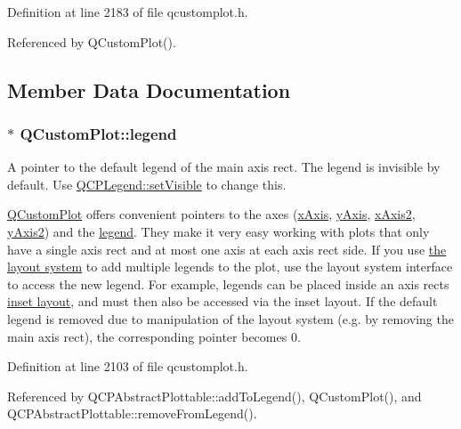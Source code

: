 Definition at line 2183 of file qcustomplot.\+h.



Referenced by Q\+Custom\+Plot().



\subsection{Member Data Documentation}
\hypertarget{class_q_custom_plot_a4eadcd237dc6a09938b68b16877fa6af}{}
\subsubsection[{legend}]{ $\ast$ Q\+Custom\+Plot\+::legend}\label{class_q_custom_plot_a4eadcd237dc6a09938b68b16877fa6af}
A pointer to the default legend of the main axis rect. The legend is invisible by default. Use \hyperlink{class_q_c_p_layerable_a3bed99ddc396b48ce3ebfdc0418744f8}{Q\+C\+P\+Legend\+::set\+Visible} to change this.

\hyperlink{class_q_custom_plot}{Q\+Custom\+Plot} offers convenient pointers to the axes (\hyperlink{class_q_custom_plot_a9a79cd0158a4c7f30cbc702f0fd800e4}{x\+Axis}, \hyperlink{class_q_custom_plot_af6fea5679725b152c14facd920b19367}{y\+Axis}, \hyperlink{class_q_custom_plot_ada41599f22cad901c030f3dcbdd82fd9}{x\+Axis2}, \hyperlink{class_q_custom_plot_af13fdc5bce7d0fabd640f13ba805c0b7}{y\+Axis2}) and the \hyperlink{class_q_custom_plot_a4eadcd237dc6a09938b68b16877fa6af}{legend}. They make it very easy working with plots that only have a single axis rect and at most one axis at each axis rect side. If you use \hyperlink{}{the layout system} to add multiple legends to the plot, use the layout system interface to access the new legend. For example, legends can be placed inside an axis rect\textquotesingle{}s \hyperlink{class_q_c_p_axis_rect_a4114887c7141b59650b7488f930993e5}{inset layout}, and must then also be accessed via the inset layout. If the default legend is removed due to manipulation of the layout system (e.\+g. by removing the main axis rect), the corresponding pointer becomes 0. 

Definition at line 2103 of file qcustomplot.\+h.



Referenced by Q\+C\+P\+Abstract\+Plottable\+::add\+To\+Legend(), Q\+Custom\+Plot(), and Q\+C\+P\+Abstract\+Plottable\+::remove\+From\+Legend().

